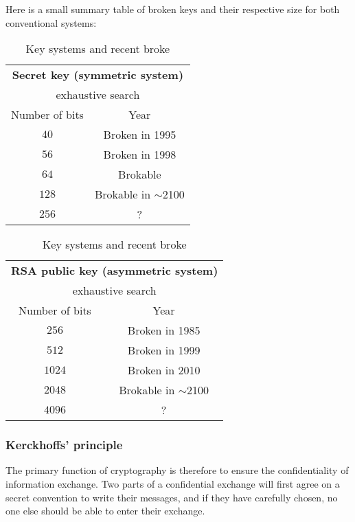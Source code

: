 		Here is a small summary table of broken keys and their respective size for both conventional systems:
		\begin{table}[H]
	\begin{center}
		\begin{tabular}{|c|c|}
			\hline
			\multicolumn{2}{|c|}{\cellcolor{black!30}\textbf{Secret key (symmetric system)}} \\
			\multicolumn{2}{|c|}{\cellcolor{black!30}exhaustive search} \\
			\hline
			\cellcolor{black!30}Number of bits & \cellcolor{black!30}Year \\
			\hline
			$40$ & Broken in 1995 \\
			\hline
			$56$ & Broken in 1998 \\
			\hline
			$64$ & Brokable \\
			\hline
			$128$ & Brokable in $\sim$2100 \\
			\hline
			$256$ & ? \\
			\hline
		\end{tabular}
		\begin{tabular}{|c|c|}
			\hline
			\multicolumn{2}{|c|}{\cellcolor{black!30}\textbf{RSA public key (asymmetric system)}} \\
			\multicolumn{2}{|c|}{\cellcolor{black!30}exhaustive search} \\
			\hline
			\cellcolor{black!30}Number of bits & \cellcolor{black!30}Year \\
			\hline
			$256$ & Broken in 1985 \\
			\hline
			$512$ & Broken in 1999 \\
			\hline
			$1024$ & Broken in 2010 \\
			\hline
			$2048$ & Brokable in $\sim$2100 \\
			\hline
			$4096$ & ? \\
			\hline
		\end{tabular}
		\caption{Key systems and recent broke}
	\end{center}
	\end{table}
	
	\subsubsection{Kerckhoffs' principle}
	The primary function of cryptography is therefore to ensure the confidentiality of information exchange. Two parts of a confidential exchange will first agree on a secret convention to write their messages, and if they have carefully chosen, no one else should be able to enter their exchange.
	
